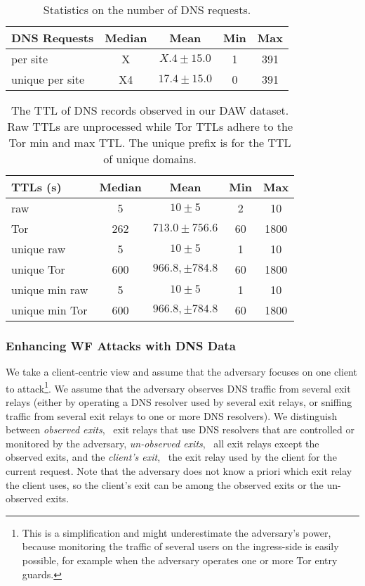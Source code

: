 \begin{table}[t]
	\centering
	\begin{tabular}{l c c c c}
	\toprule
	\textbf{DNS Requests} & \textbf{Median} & \textbf{Mean} & \textbf{Min} & \textbf{Max} \\
	\midrule
	per site & X & $X.4\pm15.0$ & 1 & 391 \\
	unique per site & X4 & $17.4\pm15.0$ & 0 & 391 \\
	\bottomrule
	\end{tabular}
	\caption{Statistics on the number of DNS requests.}
	\label{tab:daw-unique}
\end{table}


\begin{table}[t]
	\centering
	\begin{tabular}{l c c c c}
	\toprule
	\textbf{TTLs (s)} & \textbf{Median} & \textbf{Mean} & \textbf{Min} & \textbf{Max} \\
	\midrule
	raw & 5 & $10 \pm 5$ & 2 & 10 \\
	Tor & 262 & $713.0 \pm 756.6$ & 60 & 1800 \\
	unique raw & 5 & $10 \pm 5$ & 1 & 10 \\
	unique Tor & 600 & $966.8, \pm 784.8$ & 60 & 1800 \\
	unique min raw & 5 & $10 \pm 5$ & 1 & 10 \\
	unique min Tor & 600 & $966.8, \pm 784.8$ & 60 & 1800 \\
	\bottomrule
	\end{tabular}
	\caption{The TTL of DNS records observed in our DAW dataset.
	Raw TTLs are unprocessed while Tor TTLs adhere to the Tor min and max TTL.
	The unique prefix is for the TTL of unique domains.}
	\label{tab:daw-ttls}
\end{table}


\subsubsection{Enhancing WF Attacks with DNS Data}

We take a client-centric view and assume that the adversary focuses on
one client to attack\footnote{This is a simplification and might underestimate
the adversary's power, because monitoring the traffic of several users
on the ingress-side is easily possible, for example when the adversary
operates one or more Tor entry guards.}.
%
We assume that the adversary observes DNS traffic from several exit
relays (either by operating a DNS resolver used by several exit relays,
or sniffing traffic from several exit relays to one or more DNS
resolvers).
%
We distinguish between \emph{observed exits}, \ie~exit relays that use
DNS resolvers that are controlled or monitored by the adversary,
\emph{un-observed exits}, \ie~all exit relays except the observed
exits, and the \emph{client's exit}, \ie~the exit relay used by the
client for the current request.
%
Note that the adversary does not know a priori which exit relay the
client uses, so the client's exit can be among the observed exits or the
un-observed exits.

